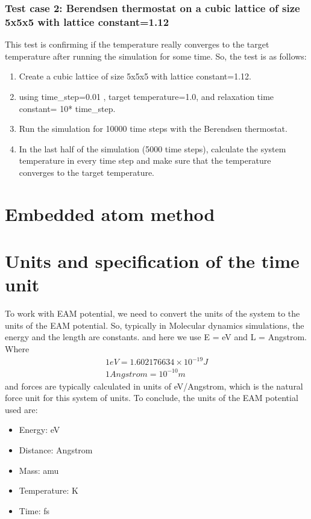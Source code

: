     \subsubsection{Test case 2: Berendsen thermostat on a cubic lattice of size 5x5x5 with lattice constant=1.12}
    This test is confirming if the temperature really converges to the target temperature after running the simulation for some time. So, the test is as follows:
    \begin{enumerate}
        \item Create a cubic lattice of size 5x5x5 with lattice constant=1.12.
        \item using time\_step=0.01 , target temperature=1.0, and relaxation time constant= 10* time\_step.
        \item Run the simulation for 10000 time steps with the Berendsen thermostat.
        \item In the last half of the simulation (5000 time steps), calculate the system temperature in every time step and make sure that the temperature converges to the target temperature.
    \end{enumerate}



\section{Embedded atom method}


\section{Units and specification of the time unit}
    To work with EAM potential, we need to convert the units of the system to the units of the EAM potential. So, typically in Molecular dynamics simulations, the energy and the length are constants. and here we use E = eV and L = Angstrom. Where
    \begin{equation}
    \label{eq:units}
        \begin{aligned}
            1 eV = 1.602176634 \times 10^{-19} J \\
            1 Angstrom = 10^{-10} m
        \end{aligned}
    \end{equation}
    and forces are typically calculated in units of eV/Angstrom, which is the natural force unit for this system of units.
    To conclude, the units of the EAM potential used are:

    \begin{itemize}
        \item Energy: eV
        \item Distance: Angstrom
        \item Mass: amu
        \item Temperature: K
        \item Time: fs
    \end{itemize}

